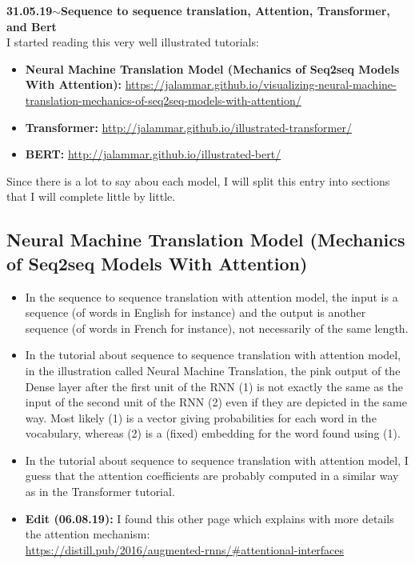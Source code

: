 \documentclass[11pt,a4paper]{article}
\newenvironment{loggentry}[2]%
{\noindent\textbf{#1}\hspace{1cm}$\mathbf{\sim}$\text{ }\textbf{#2}\\}{\vspace{0.5cm}}
\begin{document}
\begin{loggentry}{31.05.19}{Sequence to sequence translation, Attention, Transformer, and Bert}

I started reading this very well illustrated tutorials:
\begin{itemize}
\item \textbf{Neural Machine Translation Model (Mechanics of Seq2seq Models With Attention):} \url{https://jalammar.github.io/visualizing-neural-machine-translation-mechanics-of-seq2seq-models-with-attention/}
\item \textbf{Transformer:} \url{http://jalammar.github.io/illustrated-transformer/}
\item \textbf{BERT:} \url{http://jalammar.github.io/illustrated-bert/}
\end{itemize}

Since there is a lot to say abou each model, I will split this entry into sections that I will complete little by little.


\subsection{Neural Machine Translation Model (Mechanics of Seq2seq Models With Attention)}

\begin{itemize}
\item In the sequence to sequence translation with attention model, the input is a sequence (of words in English for instance) and the output is another sequence (of words in French for instance), not necessarily of the same length.
\item In the tutorial about sequence to sequence translation with attention model, in the illustration called Neural Machine Translation, the pink output of the Dense layer after the first unit of the RNN (1) is not exactly the same as the input of the second unit of the RNN (2) even if they are depicted in the same way. Most likely (1) is a vector giving probabilities for each word in the vocabulary, whereas (2) is a (fixed) embedding for the word found using (1).
\item In the tutorial about sequence to sequence translation with attention model, I guess that the attention coefficients are probably computed in a similar way as in the Transformer tutorial.
\item \textbf{Edit (06.08.19):} I found this other page which explains with more details the attention mechanism:\\
\url{https://distill.pub/2016/augmented-rnns/#attentional-interfaces}
\end{itemize}



\end{loggentry}
\end{document}
